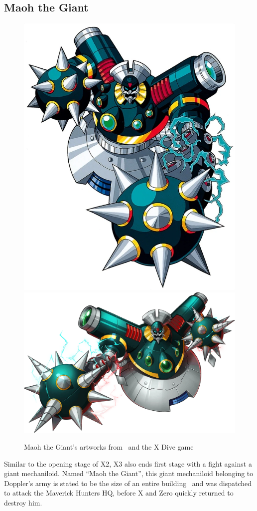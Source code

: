 \subsection{Maoh the Giant}\label{boss:Mao_the_giant}
\begin{figure}[htp]
	\centering
	\includegraphics[height=\portraitsize]{figures/X3/maohthegiant.png}
	\includegraphics[height=\portraitsize]{figures/X3/Maoh_the_Giant.png}
	\caption{Maoh the Giant's artworks from~\cite{book:MMX_Complete_art} and the X Dive game}
\end{figure}
Similar to the opening stage of X2, X3 also ends first stage with a fight against a giant mechaniloid. Named ``Maoh the Giant'', this giant mechaniloid belonging to Doppler's army is stated to be the size of an entire building~\cite{wayback:X3_resources} and was dispatched to attack the Maverick Hunters HQ, before X and Zero quickly returned to destroy him. 

